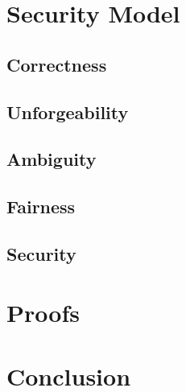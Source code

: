 \documentclass{beamer}
\begin{document}

\section{Security Model}
% 

\subsection{Correctness}
% 

\subsection{Unforgeability}
% 

\subsection{Ambiguity}
% 

\subsection{Fairness}
% 

\subsection{Security}
% 

\section{Proofs}


\section{Conclusion}

\end{document}
